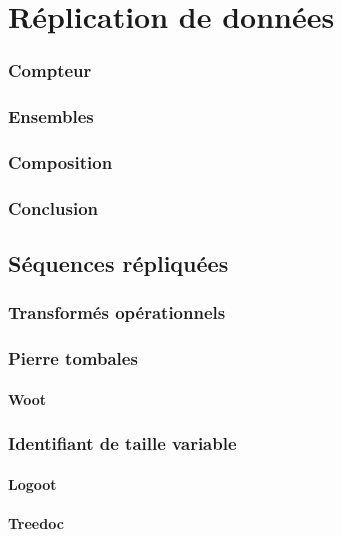
\part{Réplication de données}









\section{Compteur}
\section{Ensembles}
\section{Composition}
\section{Conclusion}

\chapter{Séquences répliquées}
\minitoc

\section{Transformés opérationnels}
\section{Pierre tombales}
\subsection{Woot}
\section{Identifiant de taille variable}
\subsection{Logoot}
\subsection{Treedoc}


